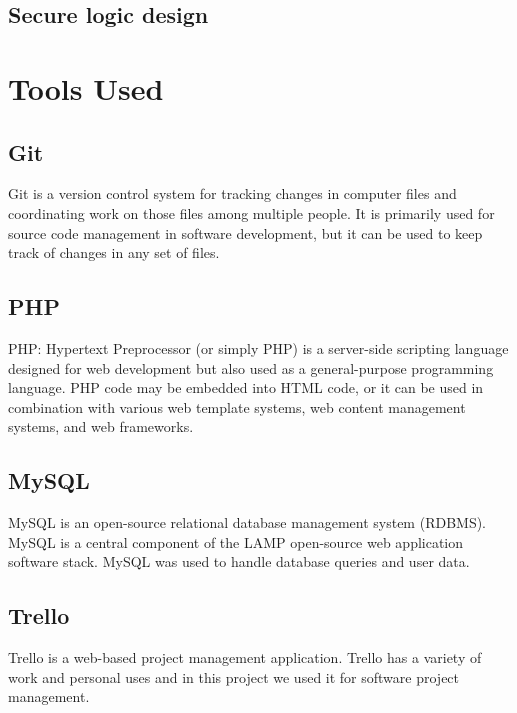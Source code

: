 \documentclass[12pt,a4paper]{article}
\begin{document}
\begin{flushleft}
	\subsection{Secure logic design}
	
	\section{Tools Used}
	\subsection{Git}
	Git is a version control system for tracking changes in computer files and coordinating work on those files among multiple people. It is primarily used for source code management in software development, but it can be used to keep track of changes in any set of files. 
	
	\subsection{PHP}
	
	PHP: Hypertext Preprocessor (or simply PHP) is a server-side scripting language designed for web development but also used as a general-purpose programming language. PHP code may be embedded into HTML code, or it can be used in combination with various web template systems, web content management systems, and web frameworks. 
	\subsection{MySQL}
	MySQL is an open-source relational database management system (RDBMS). MySQL is a central component of the LAMP open-source web application software stack. MySQL was used to handle database queries and user data.
	\subsection{Trello}
	Trello is a web-based project management application. Trello has a variety of work and personal uses and in this project we used it for  software project management.
	

\end{flushleft}
\end{document}
